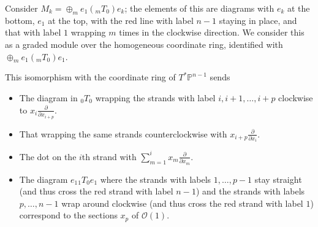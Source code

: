 Consider $M_k=\oplus_{m}e_1({}_{m}T_{0})e_k$; the elements of this are diagrams with $e_k$ at the bottom, $e_1$ at the top, with the red line with label $n-1$ staying in place, and that with label $1$ wrapping $m$ times in the clockwise direction.  We consider this as a graded module over the homogeneous coordinate ring, identified with $\oplus_{m}e_1({}_{m}T_{0})e_1$.

This isomorphism with the coordinate ring of $T^*\mathbb{P}^{n-1}$ sends
  \begin{itemize}
  \item The diagram in ${}_{0}T_{0}$ wrapping the strands with label
    $i, i+1,\dots, i+p$ clockwise to
    $x_i\frac{\partial}{\partial x_{i+p}}$.
  \item That wrapping the same strands counterclockwise with
    $x_{i+p}\frac{\partial}{\partial x_{i}}$.
  \item The dot on the $i$th strand with
    $\sum_{m=1}^{i}x_{m}\frac{\partial}{\partial x_{m}}$.
  \item The diagram $e_1{}_{1}T_{0}e_1$ where the strands with labels
    $1,\dots, p-1$ stay straight (and thus cross the red strand with
    label $n-1$) and the strands with labels $p,\dots, n-1$ wrap
    around clockwise (and thus cross the red strand with label $1$)
    correspond to the sections $x_p$ of $\mathcal{O}(1)$.
  \end{itemize}
